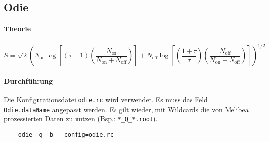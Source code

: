 \subsection{Odie}%
\label{sub:odie}

\paragraph{Theorie}%
\begin{equation}
	S = \sqrt{2} \left(
		N_\text{on} \log \left[
			(\tau + 1) \left( 
				\frac{N_\text{on}}{N_\text{on} + N_\text{off}} 
			\right)
		\right]  
		+ N_\text{off} \log \left[
			\left( \frac{1 + \tau}{\tau} \right) \left( 
				\frac{N_\text{off}}{N_\text{on} + N_\text{off}} 
			\right)
		\right]  
	\right) ^ {1/2}
\end{equation}


\paragraph{Durchführung}%

Die Konfigurationsdatei \texttt{odie.rc} wird verwendet.
Es muss das Feld \texttt{Odie.dataName} angepasst werden.
Es gilt wieder, mit Wildcards die von Melibea prozessierten Daten zu nutzen
(Bsp.: \texttt{*\_Q\_*.root}).

\begin{lstlisting}
	odie -q -b --config=odie.rc
\end{lstlisting}
